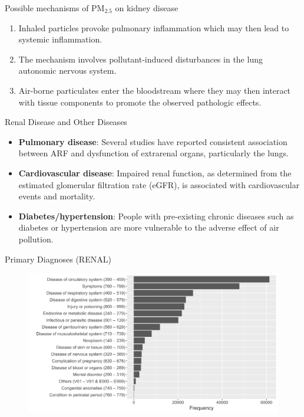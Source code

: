 \documentclass{beamer}
\begin{document}
\begin{frame}{Possible mechanisms of PM$_{2.5}$ on kidney disease}
    \begin{enumerate}
        \item Inhaled particles provoke pulmonary inflammation which may then lead to systemic inflammation.
        \item The mechanism involves pollutant-induced disturbances in the lung autonomic nervous system.
        \item Air-borne particulates enter the bloodstream where they may then interact with tissue components to promote the observed pathologic effects. 
    \end{enumerate}
\end{frame}

\begin{frame}{Renal Disease and Other Diseases}
    \begin{itemize}
        \item \textbf{Pulmonary disease}: Several studies have reported consistent association between ARF and dysfunction of extrarenal organs, particularly the lungs.
        \item \textbf{Cardiovascular disease}: Impaired renal function, as determined from the estimated glomerular filtration rate (eGFR), is associated with cardiovascular events and mortality.
        \item \textbf{Diabetes/hypertension}: People with pre-existing chronic diseases such as diabetes or hypertension are more vulnerable to the adverse effect of air pollution.
    \end{itemize}
\end{frame}

\begin{frame}{Primary Diagnoses (RENAL)}
    \label{frm:pri}
    \begin{figure}
        \centering
        \includegraphics[width=\textwidth]{img/appendix/Aim3/renal_pri.png}
    \end{figure}
\end{frame}
\end{document}
